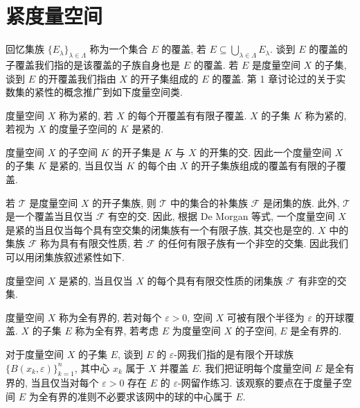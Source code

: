 \documentclass[../../main.tex]{subfiles}
\begin{document}
\section{紧度量空间}\label{section:ch09-紧度量空间}

回忆集族 $\{E_{\lambda}\}_{\lambda\in\Lambda}$ 称为一个集合 $E$ 的覆盖, 若 $E\subseteq\bigcup_{\lambda\in\Lambda}E_{\lambda}$. 谈到 $E$ 的覆盖的子覆盖我们指的是该覆盖的子族自身也是 $E$ 的覆盖. 若 $E$ 是度量空间 $X$ 的子集, 谈到 $E$ 的开覆盖我们指由 $X$ 的开子集组成的 $E$ 的覆盖. 第 1 章讨论过的关于实数集的紧性的概念推广到如下度量空间类.

\begin{definition}[紧]\label{definition:ch09-紧}
度量空间 $X$ 称为紧的, 若 $X$ 的每个开覆盖有有限子覆盖. $X$ 的子集 $K$ 称为紧的, 若视为 $X$ 的度量子空间的 $K$ 是紧的.
\end{definition}

度量空间 $X$ 的子空间 $K$ 的开子集是 $K$ 与 $X$ 的开集的交. 因此一个度量空间 $X$ 的子集 $K$ 是紧的, 当且仅当 $K$ 的每个由 $X$ 的开子集族组成的覆盖有有限的子覆盖.

若 $\mathcal{T}$ 是度量空间 $X$ 的开子集族, 则 $\mathcal{T}$ 中的集合的补集族 $\mathcal{F}$ 是闭集的族. 此外, $\mathcal{T}$ 是一个覆盖当且仅当 $\mathcal{F}$ 有空的交. 因此, 根据 De Morgan 等式, 一个度量空间 $X$ 是紧的当且仅当每个具有空交集的闭集族有一个有限子族, 其交也是空的. $X$ 中的集族 $\mathcal{F}$ 称为具有有限交性质, 若 $\mathcal{F}$ 的任何有限子族有一个非空的交集. 因此我们可以用闭集族叙述紧性如下.

\begin{proposition}\label{proposition:ch09-紧有限交}
度量空间 $X$ 是紧的, 当且仅当 $X$ 的每个具有有限交性质的闭集族 $\mathcal{F}$ 有非空的交集.
\end{proposition}

\begin{definition}[全有界]\label{definition:ch09-全有界}
度量空间 $X$ 称为全有界的, 若对每个 $\varepsilon>0$, 空间 $X$ 可被有限个半径为 $\varepsilon$ 的开球覆盖. $X$ 的子集 $E$ 称为全有界, 若考虑 $E$ 为度量空间 $X$ 的子空间, $E$ 是全有界的.
\end{definition}

对于度量空间 $X$ 的子集 $E$, 谈到 $E$ 的 $\varepsilon$-网我们指的是有限个开球族 $\{B(x_{k},\varepsilon)\}_{k=1}^{n}$, 其中心 $x_{k}$ 属于 $X$ 并覆盖 $E$. 我们把证明每个度量空间 $E$ 是全有界的, 当且仅当对每个 $\varepsilon>0$ 存在 $E$ 的 $\varepsilon$-网留作练习. 该观察的要点在于度量子空间 $E$ 为全有界的准则不必要求该网中的球的中心属于 $E$.
\end{document}
